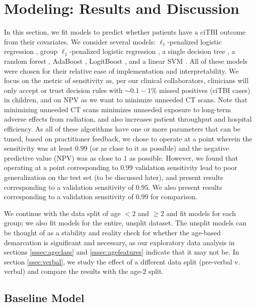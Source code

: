 \documentclass[11pt, letterpaper]{amsart}
\let\Oldsection\section
\renewcommand{\section}{\FloatBarrier\Oldsection}
\let\Oldsubsection\subsection
\renewcommand{\subsection}{\FloatBarrier\Oldsubsection}
\begin{document}
\section{Modeling: Results and Discussion}\label{sec:model}

In this section, we fit models to predict whether patients have a ciTBI outcome from their covariates. We consider several models: $\ell_1$-penalized logistic regression \cite{simon2013sparse}, group $\ell_1$-penalized logistic regression \cite{simon2013sparse}, a single decision tree \cite{safavian1991survey}, a random forest \cite{ho1995random}, AdaBoost \cite{schapire2013explaining}, LogitBoost \cite{cai2006using}, and a linear SVM \cite{boser1992training}. All of these models were chosen for their relative ease of implementation and interpretability. We focus on the metric of sensitivity as, per our clinical collaborators, clinicians will only accept or trust decision rules with $\sim 0.1-1$\% missed positives (ciTBI cases) in children, and on NPV as we want to minimize unneeded CT scans. Note that minimizing unneeded CT scans minimizes unneeded exposure to long-term adverse effects from radiation, and also increases patient throughput and hospital efficiency. As all of these algorithms have one or more parameters that can be tuned, based on practitioner feedback, we chose to operate at a point wherein the sensitivity was at least $0.99$ (or as close to it as possible) and the negative predictive value (NPV) was as close to $1$ as possible. However, we found that operating at a point corresponding to $0.99$ validation sensitivity lead to poor generalization on the test set (to be discussed later), and present results corresponding to a validation sensitivity of $0.95$. We also present results corresponding to a validation sensitivity of $0.99$ for comparison.  

We continue with the data split of age $< 2$ and $\geq 2$ and fit models for each group; we also fit models for the entire, unsplit dataset. The unsplit models can be thought of as a stability and reality check for whether the age-based demarcation is significant and necessary, as our exploratory data analysis in sections \ref{sssec:ageclass} and \ref{sssec:agefeatures} indicate that it may not be. In section \ref{ssec:verbal}, we study the effect of a different data split (pre-verbal v. verbal) and compare the results with the age-$2$ split.  

\subsection{Baseline Model} \label{ssec:baseline}
\end{document}
